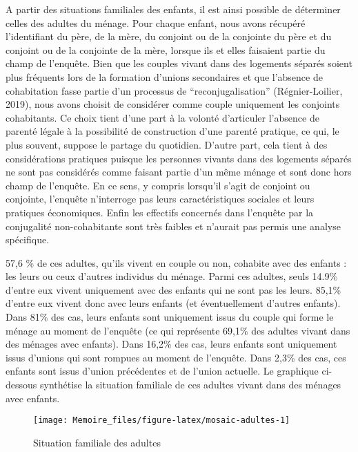 \documentclass[
  12pt,
]{book}
\begin{document}
A partir des situations familiales des enfants, il est ainsi possible de
déterminer celles des adultes du ménage. Pour chaque enfant, nous avons
récupéré l'identifiant du père, de la mère, du conjoint ou de la
conjointe du père et du conjoint ou de la conjointe de la mère, lorsque
ils et elles faisaient partie du champ de l'enquête. Bien que les
couples vivant dans des logements séparés soient plus fréquents lors de
la formation d'unions secondaires et que l'absence de cohabitation fasse
partie d'un processus de ``reconjugalisation'' (Régnier-Loilier, 2019),
nous avons choisit de considérer comme couple uniquement les conjoints
cohabitants. Ce choix tient d'une part à la volonté d'articuler
l'absence de parenté légale à la possibilité de construction d'une
parenté pratique, ce qui, le plus souvent, suppose le partage du
quotidien. D'autre part, cela tient à des considérations pratiques
puisque les personnes vivants dans des logements séparés ne sont pas
considérés comme faisant partie d'un même ménage et sont donc hors champ
de l'enquête. En ce sens, y compris lorsqu'il s'agit de conjoint ou
conjointe, l'enquête n'interroge pas leurs caractéristiques sociales et
leurs pratiques économiques. Enfin les effectifs concernés dans
l'enquête par la conjugalité non-cohabitante sont très faibles et
n'aurait pas permis une analyse spécifique.

57,6 \% de ces adultes, qu'ils vivent en couple ou non, cohabite avec
des enfants : les leurs ou ceux d'autres individus du ménage. Parmi ces
adultes, seuls 14.9\% d'entre eux vivent uniquement avec des enfants qui
ne sont pas les leurs. 85,1\% d'entre eux vivent donc avec leurs enfants
(et éventuellement d'autres enfants). Dans 81\% des cas, leurs enfants
sont uniquement issus du couple qui forme le ménage au moment de
l'enquête (ce qui représente 69,1\% des adultes vivant dans des ménages
avec enfants). Dans 16,2\% des cas, leurs enfants sont uniquement issus
d'unions qui sont rompues au moment de l'enquête. Dans 2,3\% des cas,
ces enfants sont issus d'union précédentes et de l'union actuelle. Le
graphique ci-dessous synthétise la situation familiale de ces adultes
vivant dans des ménages avec enfants.

\begin{figure}[h]

{\centering \texttt{[image: Memoire\_files/figure-latex/mosaic-adultes-1]} 

}

\caption{Situation familiale des adultes}\label{fig:mosaic-adultes}
\end{figure}
\end{document}
